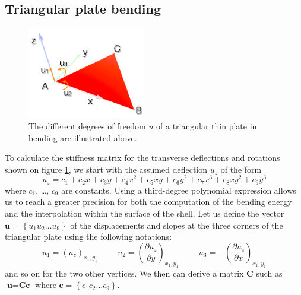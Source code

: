 \documentclass{llncs}
\begin{document}
\subsection{Triangular plate bending}

\begin{figure}
\centering
\includegraphics[height=4cm]{images/bending}
\caption {The different degrees of freedom $u$ of a triangular thin plate in bending are illustrated above.}
\label{fig-triangle}
\end{figure}

To calculate the stiffness matrix for the transverse deflections and rotations shown on figure \ref{fig-triangle}, we start with the assumed deflection $u_z$ of the form
\begin{equation}
 u_z = c_1 + c_2x + c_3y + c_4x^2 + c_5xy + c_6y^2 + c_7x^3 + c_8xy^2 + c_9y^3
\label{eq-deflection}
\end{equation} 
where $c_1$, \ldots , $c_9$ are constants. Using a third-degree polynomial expression allows us to reach a greater precision for both the computation of the bending energy and the interpolation within the surface of the shell. Let us define the vector $\textbf{u} = \left\{u_1 u_2 \ldots u_9 \right\} $ of the displacements and slopes at the three corners of the triangular plate using the following notations:
\begin{equation}
u_1 = (u_z)_{x_1,y_1} \hspace{1cm} u_2 = \left(\frac{\partial u_z}{\partial y}\right)_{x_1,y_1} \hspace{1cm} u_3 = - \left(\frac{\partial u_z}{\partial x}\right)_{x_1,y_1}
\end{equation} 
and so on for the two other vertices.
We then can derive a matrix $\textbf{C}$ such as $\textbf{u} = \textbf{Cc}$ where $\textbf{c} = \left\{c_1 c_2 \ldots c_9 \right\} $.
\end{document}
